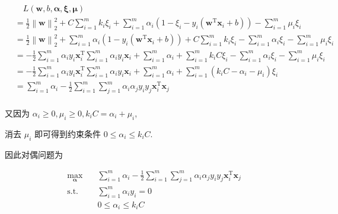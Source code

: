 \documentclass[answers]{exam}  %
\begin{document}
\begin{questions}
\begin{solution}
\begin{enumerate}
            $$
              \begin{aligned}
                 & \quad L(\bm{w}, b, \bm{\alpha}, \bm{\xi}, \bm{\mu})                                                                                                                                                             \\
                 & = \frac{1}{2} \left\| \bm{w} \right\|_{2}^{2} + C\sum_{i=1}^{m}k_i\xi_i + \sum_{i=1}^{m}\alpha_i(1-\xi_i-y_i(\bm{w}^{\mathrm{T}}\bm{x}_i + b)) - \sum_{i=1}^{m}\mu_i\xi_i                                       \\
                 & = \frac{1}{2} \left\| \bm{w} \right\|_{2}^{2} + \sum_{i=1}^{m}\alpha_i(1-y_i(\bm{w}^{\mathrm{T}}\bm{x}_i + b)) + C\sum_{i=1}^{m}k_i\xi_i - \sum_{i=1}^{m}\alpha_i\xi_i - \sum_{i=1}^{m}\mu_i\xi_i               \\
                 & = -\frac{1}{2}\sum_{i=1}^{m}\alpha_i y_i \bm{x}_i^{\mathrm{T}}\sum_{i=1}^{m}\alpha_i y_i \bm{x}_i + \sum_{i=1}^{m}\alpha_i + \sum_{i=1}^{m}k_i C \xi_i - \sum_{i=1}^{m}\alpha_i\xi_i - \sum_{i=1}^{m}\mu_i\xi_i \\
                 & = -\frac{1}{2}\sum_{i=1}^{m}\alpha_i y_i \bm{x}_i^{\mathrm{T}}\sum_{i=1}^{m}\alpha_i y_i \bm{x}_i + \sum_{i=1}^{m}\alpha_i + \sum_{i=1}^{m}(k_i C - \alpha_i - \mu_i)\xi_i                                      \\
                 & = \sum_{i=1}^{m}\alpha_i - \frac{1}{2}\sum_{i=1}^{m}\sum_{j=1}^{m}\alpha_i\alpha_j y_i y_j\bm{x}_i^{\mathrm{T}}\bm{x}_j                                                                                         \\
              \end{aligned}
            $$

            又因为 $\alpha_i \ge 0, \mu_i \ge 0, k_i C = \alpha_i + \mu_i$,

            消去 $\mu_i$ 即可得到约束条件 $0 \le \alpha_i \le k_i C$.

            因此对偶问题为

            $$
              \begin{aligned}
                \max_{\bm{\alpha}} & \quad \sum_{i=1}^{m}\alpha_i - \frac{1}{2}\sum_{i=1}^{m}\sum_{j=1}^{m}\alpha_i\alpha_j y_i y_j\bm{x}_i^{\mathrm{T}}\bm{x}_j \\
                \text{s.t.}
                                   & \quad \sum_{i=1}^{m}\alpha_i y_i = 0                                                                                        \\
                                   & \quad 0 \le \alpha_i \le k_i C                                                                                              \\
              \end{aligned}
            $$


\end{enumerate}
\end{solution}
\end{questions}
\end{document}
